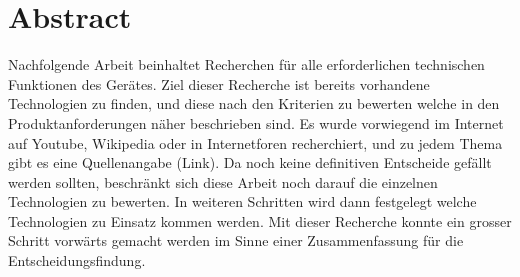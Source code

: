 \section{Abstract}
Nachfolgende Arbeit beinhaltet Recherchen für alle erforderlichen technischen Funktionen des Gerätes. Ziel dieser Recherche ist bereits vorhandene Technologien zu finden, und diese nach den Kriterien zu bewerten welche in den Produktanforderungen näher beschrieben sind. Es wurde vorwiegend im Internet auf Youtube, Wikipedia oder in Internetforen recherchiert, und zu jedem Thema gibt es eine Quellenangabe (Link). Da noch keine definitiven Entscheide gefällt werden sollten, beschränkt sich diese Arbeit noch darauf die einzelnen Technologien zu bewerten. In weiteren Schritten wird dann festgelegt welche Technologien zu Einsatz kommen werden. Mit dieser Recherche konnte ein grosser Schritt vorwärts gemacht werden im Sinne einer Zusammenfassung für die Entscheidungsfindung.